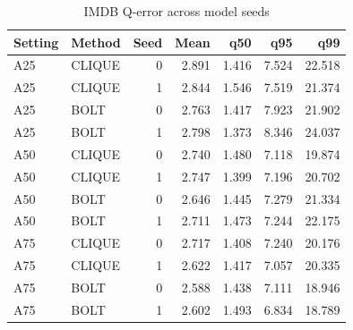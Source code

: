\begin{table}[H]
\centering
\small
\setlength{\tabcolsep}{5pt}
\caption{IMDB Q-error across model seeds}
\label{tab:imdb-seeds}
\begin{tabular}{@{}llrrrrr@{}}
\toprule
Setting & Method & Seed & Mean & q50 & q95 & q99 \\
\midrule
A25 & CLIQUE & 0 & 2.891 & 1.416 & 7.524 & 22.518 \\
A25 & CLIQUE & 1 & 2.844 & 1.546 & 7.519 & 21.374 \\
A25 & BOLT & 0 & 2.763 & 1.417 & 7.923 & 21.902 \\
A25 & BOLT & 1 & 2.798 & 1.373 & 8.346 & 24.037 \\
A50 & CLIQUE & 0 & 2.740 & 1.480 & 7.118 & 19.874 \\
A50 & CLIQUE & 1 & 2.747 & 1.399 & 7.196 & 20.702 \\
A50 & BOLT & 0 & 2.646 & 1.445 & 7.279 & 21.334 \\
A50 & BOLT & 1 & 2.711 & 1.473 & 7.244 & 22.175 \\
A75 & CLIQUE & 0 & 2.717 & 1.408 & 7.240 & 20.176 \\
A75 & CLIQUE & 1 & 2.622 & 1.417 & 7.057 & 20.335 \\
A75 & BOLT & 0 & 2.588 & 1.438 & 7.111 & 18.946 \\
A75 & BOLT & 1 & 2.602 & 1.493 & 6.834 & 18.789 \\
\bottomrule
\end{tabular}
\end{table}
